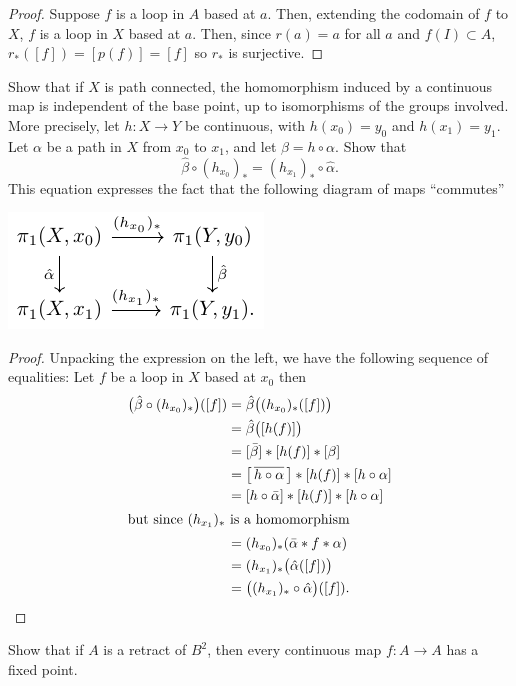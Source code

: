 \begin{proof}
Suppose $f$ is a loop in $A$ based at $a$. Then, extending the
codomain of $f$ to $X$, $f$ is a loop in $X$ based at $a$. Then,
since $r(a)=a$ for all $a$ and $f(I)\subset A$,
$r_*([f])=[p(f)]=[f]$ so $r_*$ is surjective.
\end{proof}
\newpage
\begin{problem}[Munkres \S53, Ex.\,6]
Show that if $X$ is path connected, the homomorphism induced by a
continuous map is independent of the base point, up to
isomorphisms of the groups involved. More precisely, let $h\colon
X\to Y$ be continuous, with $h(x_0)=y_0$ and $h(x_1)=y_1$. Let
$\alpha$ be a path in $X$ from $x_0$ to $x_1$, and let
$\beta=h\circ\alpha$. Show that
\[
\hat\beta\circ(h_{x_0})_*=(h_{x_1})_*\circ\hat\alpha.
\]
This equation expresses the fact that the following diagram of
maps ``commutes''
\begin{center}
\includegraphics{figures/hw-10-path-connected-hom-indep}
\end{center}
\end{problem}
\begin{proof}
Unpacking the expression on the left, we have the following
sequence of equalities: Let $f$ be a loop in $X$ based at $x_0$
then
\begin{align*}
\bigl(\hat\beta\circ(h_{x_0})_*\bigr)([f])
&=\hat\beta\bigl((h_{x_0})_*([f])\bigr)\\
&=\hat\beta\bigl([h(f)]\bigr)\\
&=[\bar\beta]*[h(f)]*[\beta]\\
&=\bigl[\,\overline{h\circ\alpha}\,\bigr]*[h(f)]*[h\circ\alpha]\\
&=[h\circ\bar\alpha]*[h(f)]*[h\circ\alpha]\\
\shortintertext{but since $(h_{x_1})_*$ is a homomorphism}
&=(h_{x_0})_*(\bar\alpha*f*\alpha)\\
&=(h_{x_1})_*\bigl(\hat\alpha([f])\bigr)\\
&=\bigl((h_{x_1})_*\circ\hat\alpha\bigr)([f]).
\end{align*}
\end{proof}
\newpage
\begin{problem}[Munkres \S55, Ex.\,1]
Show that if $A$ is a retract of $B^2$, then every continuous map
$f\colon A\to A$ has a fixed point.
\end{problem}
